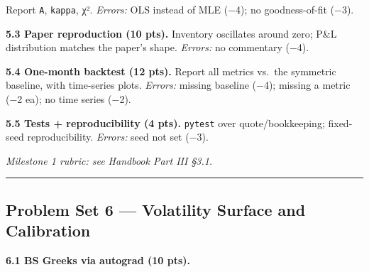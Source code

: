 \documentclass[
]{article}
\begin{document}
Report \texttt{A}, \texttt{kappa}, χ². \emph{Errors:} OLS instead of MLE
(−4); no goodness-of-fit (−3).

\textbf{5.3 Paper reproduction (10 pts).} Inventory oscillates around
zero; P\&L distribution matches the paper's shape. \emph{Errors:} no
commentary (−4).

\textbf{5.4 One-month backtest (12 pts).} Report all metrics vs.~the
symmetric baseline, with time-series plots. \emph{Errors:} missing
baseline (−4); missing a metric (−2 ea); no time series (−2).

\textbf{5.5 Tests + reproducibility (4 pts).} \texttt{pytest} over
quote/bookkeeping; fixed-seed reproducibility. \emph{Errors:} seed not
set (−3).

\emph{Milestone 1 rubric: see Handbook Part III §3.1.}

\begin{center}\rule{0.5\linewidth}{0.5pt}\end{center}

\subsection{Problem Set 6 --- Volatility Surface and
Calibration}\label{problem-set-6-volatility-surface-and-calibration}

\textbf{6.1 BS Greeks via autograd (10 pts).}
\end{document}
